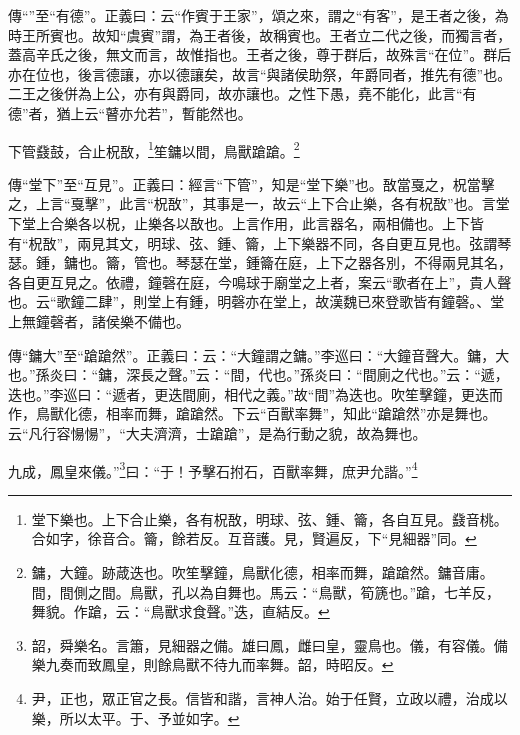 {\noindent\zhuan{}\fzbyks 傳“”至“有德”。正義曰：云“作賓于王家”，頌之來，謂之“有客”，是王者之後，為時王所賓也。故知“虞賓”謂，為王者後，故稱賓也。王者立二代之後，而獨言者，蓋高辛氏之後，無文而言，故惟指也。王者之後，尊于群后，故殊言“在位”。群后亦在位也，後言德讓，亦以德讓矣，故言“與諸侯助祭，年爵同者，推先有德”也。二王之後併為上公，亦有與爵同，故亦讓也。之性下愚，堯不能化，此言“有德”者，猶上云“瞽亦允若”，暫能然也。 \par}

下管鼗鼓，合止柷敔，\footnote{堂下樂也。上下合止樂，各有柷敔，明球、弦、鍾、籥，各自互見。鼗音桃。合如字，徐音合。籥，餘若反。互音護。見，賢遍反，下“見細器”同。}笙鏞以間，鳥獸蹌蹌。\footnote{鏞，大鐘。跡葴迭也。吹笙擊鐘，鳥獸化德，相率而舞，蹌蹌然。鏞音庸。間，間側之間。鳥獸，孔以為自舞也。馬云：“鳥獸，筍篪也。”蹌，七羊反，舞貌。作蹌，云：“鳥獸求食聲。”迭，直結反。}


{\noindent\zhuan{}\fzbyks 傳“堂下”至“互見”。正義曰：經言“下管”，知是“堂下樂”也。敔當戛之，柷當擊之，上言“戛擊”，此言“柷敔”，其事是一，故云“上下合止樂，各有柷敔”也。言堂下堂上合樂各以柷，止樂各以敔也。上言作用，此言器名，兩相備也。上下皆有“柷敔”，兩見其文，明球、弦、鍾、籥，上下樂器不同，各自更互見也。弦謂琴瑟。鍾，鏞也。籥，管也。琴瑟在堂，鍾籥在庭，上下之器各別，不得兩見其名，各自更互見之。依禮，鐘磬在庭，今鳴球于廟堂之上者，案云“歌者在上”，貴人聲也。云“歌鐘二肆”，則堂上有鍾，明磬亦在堂上，故漢魏已來登歌皆有鐘磬。、堂上無鐘磬者，諸侯樂不備也。 \par}

{\noindent\zhuan{}\fzbyks 傳“鏞大”至“蹌蹌然”。正義曰：云：“大鐘謂之鏞。”李巡曰：“大鐘音聲大。鏞，大也。”孫炎曰：“鏞，深長之聲。”云：“間，代也。”孫炎曰：“間廁之代也。”云：“遞，迭也。”李巡曰：“遞者，更迭間廁，相代之義。”故“間”為迭也。吹笙擊鐘，更迭而作，鳥獸化德，相率而舞，蹌蹌然。下云“百獸率舞”，知此“蹌蹌然”亦是舞也。云“凡行容愓愓”，“大夫濟濟，士蹌蹌”，是為行動之貌，故為舞也。 \par}

九成，鳳皇來儀。”\footnote{韶，舜樂名。言簫，見細器之備。雄曰鳳，雌曰皇，靈鳥也。儀，有容儀。備樂九奏而致鳳皇，則餘鳥獸不待九而率舞。韶，時昭反。}曰：“于！予擊石拊石，百獸率舞，庶尹允諧。”\footnote{尹，正也，眾正官之長。信皆和諧，言神人治。始于任賢，立政以禮，治成以樂，所以太平。于、予並如字。}

